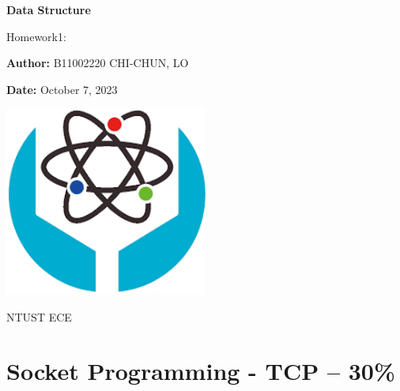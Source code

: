\documentclass{article}
\begin{document}
	\begin{titlepage}
		\centering
		\vspace*{1cm}
		\Huge
		\textbf{Data Structure}
		
		\vspace{0.5cm}
		\LARGE
		Homework1:
		
		\vspace{2cm}
		\textbf{Author:} B11002220 CHI-CHUN, LO
		
		\vspace{1cm}



		\textbf{Date: }October 7, 2023
		
		\vfill
		
    	\includegraphics[width=0.5\textwidth]{logo.png}
		
		\vspace{2cm}
		NTUST ECE
		
	\end{titlepage}
	\pagebreak
	\tableofcontents
	
	
	\pagebreak
	\section{Socket Programming - TCP – 30\%}	



	
\end{document}
